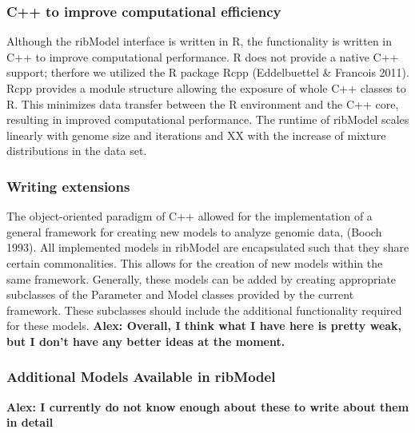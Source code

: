 \documentclass{bioinfo}
\newcommand{\package}{ribModel } %
\begin{document}
\subsubsection*{C++ to improve computational efficiency}
Although the \package interface is written in R, the functionality is written in C++ to improve computational performance.  
R does not provide a native C++ support; therfore we utilized the R package Rcpp (Eddelbuettel \& Francois 2011). 
Rcpp provides a module structure allowing the exposure of whole C++ classes to R. This minimizes data transfer between the R environment and the C++ core, resulting in improved computational performance. 
The runtime of \package scales linearly with genome size and iterations and XX with the increase of mixture distributions in the data set.

\subsubsection*{Writing extensions}
The object-oriented paradigm of C++ allowed for the implementation of a general framework for creating new models to analyze genomic data, (Booch 1993). All implemented models in \package are encapsulated such that they share certain commonalities. This allows for the creation of new models within the same framework. Generally, these models can be added by creating appropriate subclasses of the Parameter and Model classes provided by the current framework. These subclasses should include the additional functionality required for these models. \textbf{Alex: Overall, I think what I have here is pretty weak, but I don't have any better ideas at the moment.} 

\subsubsection*{Additional Models Available in \package}
\textbf{Alex: I currently do not know enough about these to write about them in detail}
\end{document}
